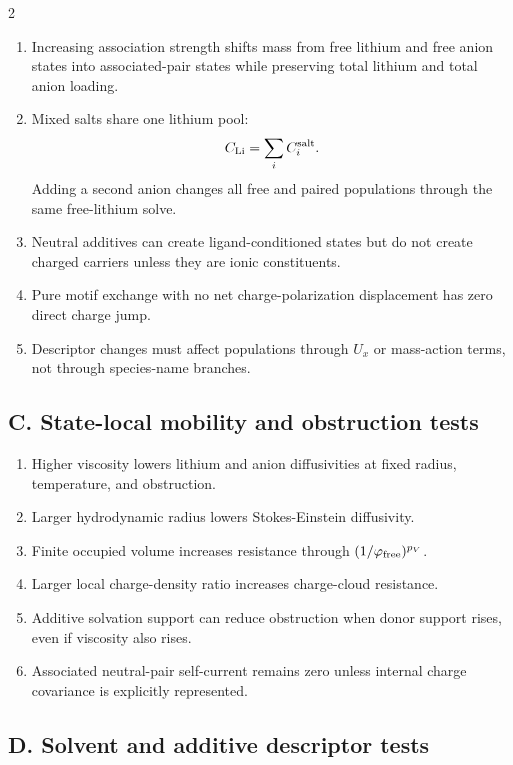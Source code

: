\documentclass[10pt]{article}
\begin{document}
\begin{multicols}{2}
\begin{enumerate}
\item Increasing association strength shifts mass from free lithium and free
anion states into associated-pair states while preserving total lithium and
total anion loading.
\item Mixed salts share one lithium pool:
\[
C_{\rm Li}=\sum_i C_i^{\rm salt}.
\]
Adding a second anion changes all free and paired populations through the same
free-lithium solve.
\item Neutral additives can create ligand-conditioned states but do not create
charged carriers unless they are ionic constituents.
\item Pure motif exchange with no net charge-polarization displacement has
zero direct charge jump.
\item Descriptor changes must affect populations through \(U_x\) or mass-action
terms, not through species-name branches.
\end{enumerate}

\subsection{C. State-local mobility and obstruction tests}

\begin{enumerate}
\item Higher viscosity lowers lithium and anion diffusivities at fixed radius,
temperature, and obstruction.
\item Larger hydrodynamic radius lowers Stokes-Einstein diffusivity.
\item Finite occupied volume increases resistance through
\((1/\varphi_{\rm free})^{p_V}\).
\item Larger local charge-density ratio increases charge-cloud resistance.
\item Additive solvation support can reduce obstruction when donor support rises,
even if viscosity also rises.
\item Associated neutral-pair self-current remains zero unless internal charge
covariance is explicitly represented.
\end{enumerate}

\subsection{D. Solvent and additive descriptor tests}


\end{multicols}
\end{document}
